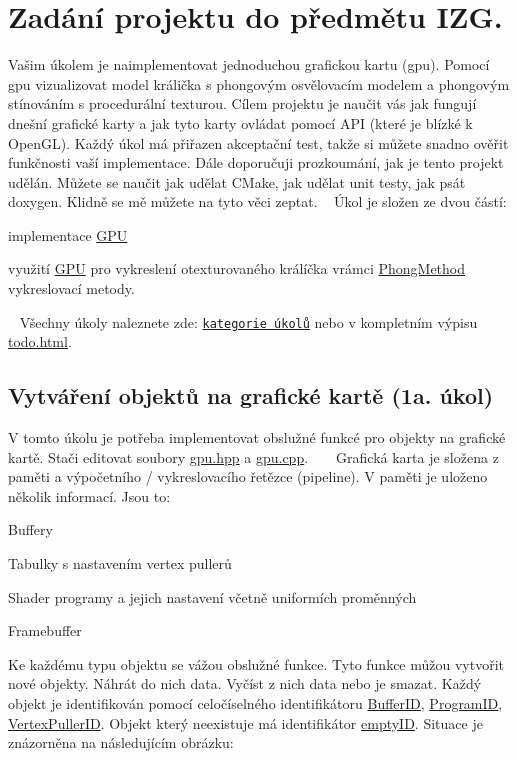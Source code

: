 \hypertarget{index_zadani}{}\section{Zadání projektu do předmětu I\+Z\+G.}\label{index_zadani}
 Vašim úkolem je naimplementovat jednoduchou grafickou kartu (gpu). Pomocí gpu vizualizovat model králička s phongovým osvělovacím modelem a phongovým stínováním s procedurální texturou. Cílem projektu je naučit vás jak fungují dnešní grafické karty a jak tyto karty ovládat pomocí A\+PI (které je blízké k Open\+GL). Každý úkol má přiřazen akceptační test, takže si můžete snadno ověřit funkčnosti vaší implementace. Dále doporučuji prozkoumání, jak je tento projekt udělán. Můžete se naučit jak udělat C\+Make, jak udělat unit testy, jak psát doxygen. Klidně se mě můžete na tyto věci zeptat. ~\newline
 Úkol je složen ze dvou částí\+: 
\begin{DoxyEnumerate}
\item implementace \hyperlink{classGPU}{G\+PU} 
\item využití \hyperlink{classGPU}{G\+PU} pro vykreslení otexturovaného králíčka vrámci \hyperlink{classPhongMethod}{Phong\+Method} vykreslovací metody. 
\end{DoxyEnumerate} ~\newline
 Všechny úkoly naleznete zde\+: \href{modules.html}{\tt kategorie úkolů} nebo v kompletním výpisu \hyperlink{todo}{todo.\+html}.\hypertarget{index_Overview}{}\subsection{Vytváření objektů na grafické kartě (1a. úkol)}\label{index_Overview}
V tomto úkolu je potřeba implementovat obslužné funkcé pro objekty na grafické kartě. Stači editovat soubory \hyperlink{gpu_8hpp}{gpu.\+hpp} a \hyperlink{gpu_8cpp}{gpu.\+cpp}. ~\newline
 ~\newline
 Grafická karta je složena z paměti a výpočetního / vykreslovacího řetězce (pipeline).  V paměti je uloženo několik informací. Jsou to\+: 
\begin{DoxyItemize}
\item Buffery 
\item Tabulky s nastavením vertex pullerů 
\item Shader programy a jejich nastavení včetně uniformích proměnných 
\item Framebuffer 
\end{DoxyItemize} Ke každému typu objektu se vážou obslužné funkce. Tyto funkce můžou vytvořit nové objekty. Náhrát do nich data. Vyčíst z nich data nebo je smazat. Každý objekt je identifikován pomocí celočíselného identifikátoru \hyperlink{fwd_8hpp_a5114031b77b80ad895eff688720b7f93}{Buffer\+ID}, \hyperlink{fwd_8hpp_a46ffd067c21ab50f5f1fcfed5d8bfc15}{Program\+ID}, \hyperlink{fwd_8hpp_af6f78f73099477c9ce5537d657597486}{Vertex\+Puller\+ID}. Objekt který neexistuje má identifikátor \hyperlink{fwd_8hpp_a85f029d54035997f9d5f499008d5f623}{empty\+ID}. Situace je znázorněna na následujícím obrázku\+:



